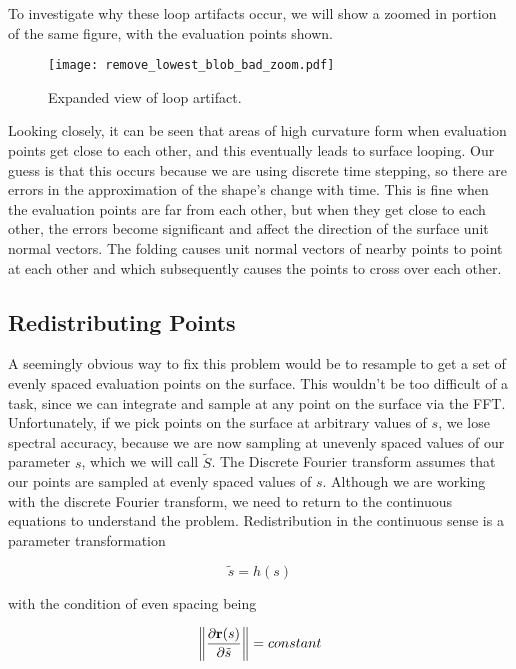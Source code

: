 To investigate why these loop artifacts occur, we will show a zoomed in portion of the same figure, with the evaluation points shown. 

\begin{figure}[h!]
    \begin{center}
      \texttt{[image: remove\_lowest\_blob\_bad\_zoom.pdf]}
    \end{center}
  \vspace{-.2in} %
  \caption{Expanded view of loop artifact.\label{fig:remove-lowest-blog-bad-zoom}}
\end{figure}

Looking closely, it can be seen that areas of high curvature form when evaluation points get close to each other, and this eventually leads to surface looping. Our guess is that this occurs because we are using discrete time stepping, so there are errors in the approximation of the shape's change with time. This is fine when the evaluation points are far from each other, but when they get close to each other, the errors become significant and affect the direction of the surface unit normal vectors. The folding causes unit normal vectors of nearby points to point at each other and which subsequently causes the points to cross over each other.

\subsection*{Redistributing Points}

A seemingly obvious way to fix this problem would be to resample to get a set of evenly spaced evaluation points on the surface. This wouldn't be too difficult of a task, since we can integrate and sample at any point on the surface via the FFT. Unfortunately, if we pick points on the surface at arbitrary values of $s$, we lose spectral accuracy, because we are now sampling at unevenly spaced values of our parameter $s$, which we will call $\tilde{S}$. The Discrete Fourier transform assumes that our points are sampled at evenly spaced values of $s$. Although we are working with the discrete Fourier transform, we need to return to the continuous equations to understand the problem. Redistribution in the continuous sense is a parameter transformation

\[ 
  \tilde{s} = h(s)
\]

with the condition of even spacing being

\[
  \norm{\frac{\partial \bvec{r}(s)}{\partial \tilde{s}}} = constant
\]


